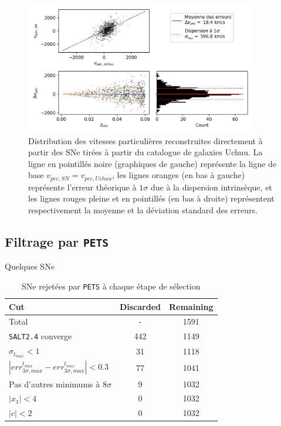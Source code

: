 \documentclass{book}
\def\pets{\texttt{PETS}\xspace}
\def\saltd{\texttt{SALT2.4}\xspace}
\begin{document}
\begin{figure}
	\centering
	\includegraphics[width=0.9\textwidth]{figures/vp_draw.png}
	\caption{Distribution des vitesses particulières reconstruites directement à partir des SNe tirées à partir du catalogue de galaxies Uchuu. La ligne en pointillés noire (graphiques de gauche) représente la ligne de base $v_{pec, SN} = v_{pec, Uchuu}$, les lignes oranges (en bas à gauche) représente l'erreur théorique à $1\sigma$ due à la dispersion intrinsèque, et les lignes rouges pleine et en pointillés (en bas à droite) représentent respectivement la moyenne et la déviation standard des erreurs.}
	\label{fig:vp_draw}
\end{figure}

\subsection{Filtrage par \pets}

Quelques SNe 

\begin{table}
    \centering
    \begin{tabular}{p{5cm}|c|c}
         Cut & Discarded & Remaining\\
         \hline
         Total & - & 1591\\
         \saltd converge & 442 & 1149\\
         $\sigma_{t_{max}}<1$ & 31 & 1118\\
         $|err^{t_{max}}_{3\sigma, max} - err^{t_{max}}_{3\sigma, max}|<0.3$ & 77 & 1041\\
         Pas d'autres minimums à $8\sigma$ & 9 & 1032\\
	$|x_1|<4$ & 0 & 1032\\
	$|c|<2$ & 0  & 1032
    \end{tabular}
    \caption{SNe rejetées par \pets à chaque étape de sélection}
    \label{tab:pets}
\end{table}
\end{document}
